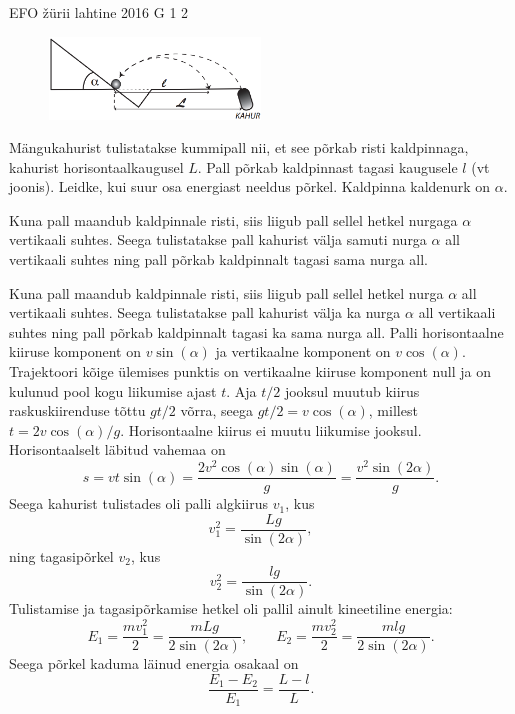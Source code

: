 {EFO žürii} %
{lahtine} %
{2016} %
{G 1} %
{2} %
{
\ifStatement
\begin{figure}
  \vspace{-20pt}
  \begin{center}
    \includegraphics[width=0.5\textwidth]{2016-lahg-01-kaldjoonis}
  \end{center}
  \vspace{-30pt}
\end{figure}

Mängukahurist tulistatakse kummipall nii, et see põrkab risti kaldpinnaga, kahurist horisontaalkaugusel $L$. Pall põrkab kaldpinnast tagasi kaugusele $l$ (vt joonis). Leidke, kui suur osa energiast neeldus põrkel. Kaldpinna kaldenurk on $\alpha$.
\fi


\ifHint
Kuna pall maandub kaldpinnale risti, siis liigub pall sellel hetkel nurgaga $\alpha$ vertikaali suhtes. Seega tulistatakse pall kahurist välja samuti nurga $\alpha$ all vertikaali suhtes ning pall põrkab kaldpinnalt tagasi sama nurga all.
\fi


\ifSolution
Kuna pall maandub kaldpinnale risti, siis liigub pall sellel hetkel nurga $\alpha$ all vertikaali suhtes. Seega tulistatakse pall kahurist välja ka nurga $\alpha$ all vertikaali suhtes ning pall põrkab kaldpinnalt tagasi ka sama nurga all. Palli horisontaalne kiiruse komponent on $v\sin(\alpha)$ ja vertikaalne komponent on $v\cos(\alpha)$. Trajektoori kõige ülemises punktis on vertikaalne kiiruse komponent null ja on kulunud pool kogu liikumise ajast $t$. Aja $t/2$ jooksul muutub kiirus raskuskiirenduse tõttu $gt/2$ võrra, seega $gt/2 =v\cos(\alpha)$, millest $t=2v\cos(\alpha)/g$. Horisontaalne kiirus ei muutu liikumise jooksul. Horisontaalselt läbitud vahemaa on $$s=vt\sin(\alpha)=\frac{2v^2\cos(\alpha)\sin(\alpha)}{g} = \frac{v^2\sin(2\alpha)}{g}.$$
Seega kahurist tulistades oli palli algkiirus $v_1$, kus
\[ v_1^2 = \frac{Lg}{\sin(2\alpha)}, \]
ning tagasipõrkel $v_2$, kus
\[ v_2^2 = \frac{lg}{\sin(2\alpha)}. \]
Tulistamise ja tagasipõrkamise hetkel oli pallil ainult kineetiline energia:
\[ E_1 = \frac{mv_1^2}{2}=\frac{mLg}{2\sin(2\alpha)},\quad\quad E_2 =\frac{mv_2^2}{2} = \frac{mlg}{2\sin(2\alpha)}. \]
Seega põrkel kaduma läinud energia osakaal on
\[ \frac{E_1-E_2}{E_1} = \frac{L-l}{L}. \]
\fi


}
